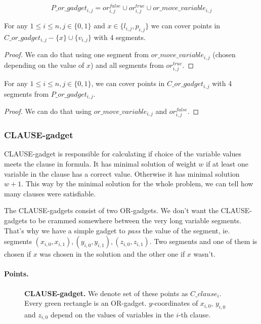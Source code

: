 $$P\_or\_gadget_{i, j} = 
  or^{false}_{i, j} \cup or^{true}_{i, j} \cup or\_move\_variable_{i, j}
  $$


\begin{lemma}
\label{cover_or_true}
For any $1 \le i \le n, j \in \{0, 1\}$ and 
 $x \in \{l_{i, j}, p_{i, j}\}$ we can cover points in
$C\_or\_gadget_{i, j} - \{ x\} \cup \{v_{i, j}\}$
with 4 segments.
\end{lemma}

\begin{proof}
We can do that using one segment from
$or\_move\_variable_{i, j}$
(chosen depending on the value of $x$)
and all segments from $or^{true}_{i, j}$.
\end{proof}

\begin{lemma}
\label{cover_or_false}
For any $1 \le i \le n, j \in \{0, 1\}$, we can cover points in
$C\_or\_gadget_{i, j}$ with 4 segments from $P\_or\_gadget_{i,j}$.
\end{lemma}

\begin{proof}
We can do that using  $or\_move\_variable_{i, j}$
and $or^{false}_{i, j}$.
\end{proof}


\subsubsection{CLAUSE-gadget}


CLAUSE-gadget is responsible for calculating if choice of the
variable values meets the clause in formula.
It has minimal solution of weight $w$ if at least one variable
in the clause has a correct value.
Otherwise it has minimal solution $w+1$.
This way by the minimal solution for the whole problem, we can tell
how many clauses were satisfiable.

The CLAUSE-gadgets consist of two OR-gadgets.
We don't want the CLAUSE-gadgets to be crammed 
somewhere between
the very long variable segments. That's why we have a simple
gadget to \textit{pass} the value of the segment, ie. segments
$(x_{i, 0}, x_{i, 1}), (y_{i, 0}, y_{i, 1}), (z_{i, 0}, z_{i, 1})$.
Two segments and one of them is chosen if $x$ was chosen
in the solution and the other one if $x$ wasn't.

\paragraph{Points.}


\begin{figure}[h]
\centering
\def\svgwidth{0.8\columnwidth}

\caption{\textbf{CLAUSE-gadget.}
We denote set of these points as $C\_clause_i$.
Every green rectangle is an OR-gadget.
$y$-coordinates of $x_{i, 0}$, $y_{i, 0}$ and $z_{i,0}$
depend on the values of variables in the $i$-th clause.
}
\label{fig:apx_clause}
\end{figure}

